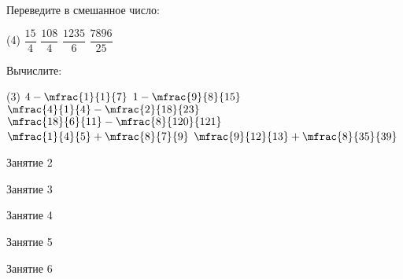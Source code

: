 \begin{class}[number=1]
\begin{listofex}
		\item Переведите в смешанное число:
		\begin{tasks}(4)
			\task \( \dfrac{15}{4} \)
			\task \( \dfrac{108}{4} \)
			\task \( \dfrac{1235}{6} \)
			\task \( \dfrac{7896}{25} \)
		\end{tasks}
		\item Вычислите:
		\begin{tasks}(3)
			\task \( 4-\mfrac{1}{1}{7} \)
			\task \( 1-\mfrac{9}{8}{15} \)
			\task \( \mfrac{4}{1}{4}-\mfrac{2}{18}{23} \)
			\task \( \mfrac{18}{6}{11}-\mfrac{8}{120}{121} \)
			\task \( \mfrac{1}{4}{5}+\mfrac{8}{7}{9} \)
			\task \( \mfrac{9}{12}{13}+\mfrac{8}{35}{39} \)
		\end{tasks}
	\end{listofex}
\end{class}

\begin{class}[number=2]
	\begin{listofex}
		\item Занятие 2
	\end{listofex}
\end{class}

\begin{class}[number=3]
	\begin{listofex}
		\item Занятие 3 
	\end{listofex}
\end{class}

\begin{class}[number=4]
	\begin{listofex}
		\item Занятие 4
	\end{listofex}
\end{class}

\begin{class}[number=5]
	\begin{listofex}
		\item Занятие 5
	\end{listofex}
\end{class}

\begin{class}[number=6]
	\begin{listofex}
		\item Занятие 6
	\end{listofex}
\end{class}

